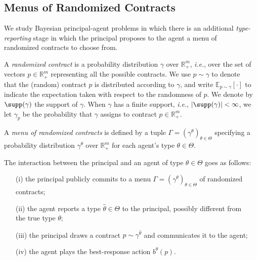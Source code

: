 \subsection{Menus of Randomized Contracts}\label{sec:preliminaries_contracts}


We study Bayesian principal-agent problems in which there is an additional \emph{type-reporting} stage in which the principal proposes to the agent a menu of randomized contracts to choose from.

A \emph{randomized contract} is a probability distribution $\gamma$ over $\mathbb{R}^m_+$, \emph{i.e.}, over the set of vectors $p \in \mathbb{R}^m_+$ representing all the possible contracts.
%
We use $p \sim \gamma$ to denote that the (random) contract $p$ is distributed according to $\gamma$, and write $\mathbb{E}_{p \sim \gamma} [\cdot]$ to indicate the expectation taken with respect to the randomness of $p$.
%
We denote by $\supp (\gamma)$ the support of $\gamma$.
%
When $\gamma$ has a finite support, \emph{i.e.}, $|\supp (\gamma)| < \infty$, we let $\gamma_p $ be the probability that $\gamma$ assigns to contract $p \in \mathbb{R}^m_+$.


A \emph{menu of randomized contracts} is defined by a tuple $\Gamma = \left( \gamma^\theta \right)_{\theta \in \Theta}$ specifying a probability distribution $\gamma^\theta$ over $\mathbb{R}^m_+$ for each agent's type $\theta \in \Theta$.


The interaction between the principal and an agent of type $\theta \in \Theta$ goes as follows:
%
\begin{itemize}
	\item[(i)] the principal publicly commits to a menu $\Gamma = \left( \gamma^\theta \right)_{\theta \in \Theta}$ of randomized contracts;
	\item[(ii)] the agent reports a type $\hat \theta \in \Theta$ to the principal, possibly different from the true type $\theta$;
	\item[(iii)] the principal draws a contract $p \sim \gamma^{\hat \theta}$ and communicates it to the agent;
	\item[(iv)] the agent plays the best-response action $b^\theta(p)$.
\end{itemize}



